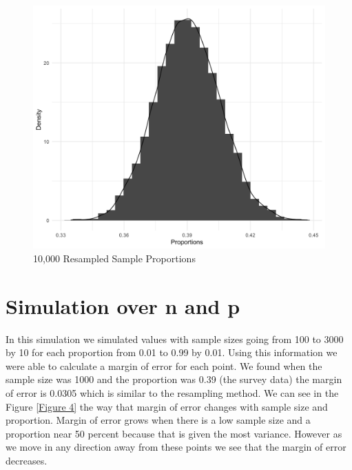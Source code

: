 \documentclass{article}\usepackage[]{graphicx}\usepackage[]{xcolor}
\begin{document}
\begin{multicols}{2}
\begin{figure}[H]
\begin{center}
\includegraphics[scale=0.14]{third.png}
\caption{10,000 Resampled Sample Proportions}
\label{Figure 3}
\end{center}
\end{figure}

\section{Simulation over n and p}

In this simulation we simulated values with sample sizes going from 100 to 3000 by 10 for each proportion from 0.01 to 0.99 by 0.01. Using this information we were able to calculate a margin of error for each point. We found when the sample size was 1000 and the proportion was 0.39 (the survey data) the margin of error is 0.0305 which is similar to the resampling method. We can see in the Figure \ref{Figure 4} the way that margin of error changes with sample size and proportion. Margin of error grows when there is a low sample size and a proportion near 50 percent because that is given the most variance. However as we move in any direction away from these points we see that the margin of error decreases.


\end{multicols}
\end{document}

